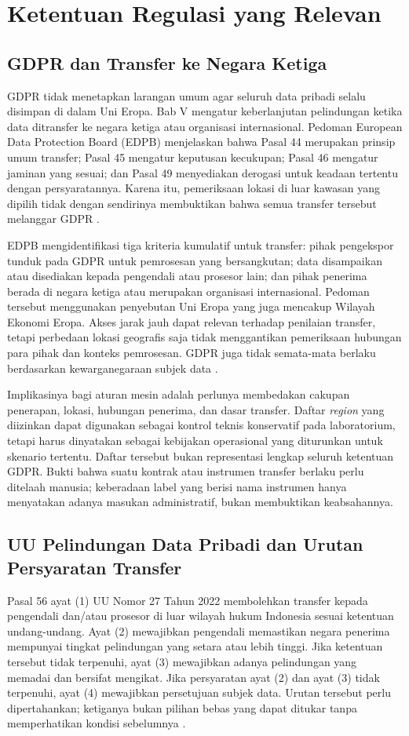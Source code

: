 \section{Ketentuan Regulasi yang Relevan}
\label{sec:regulasi-residensi}
\subsection{GDPR dan Transfer ke Negara Ketiga}
GDPR tidak menetapkan larangan umum agar seluruh data pribadi selalu disimpan di dalam Uni Eropa. Bab V mengatur keberlanjutan pelindungan ketika data ditransfer ke negara ketiga atau organisasi internasional. Pedoman European Data Protection Board (EDPB) menjelaskan bahwa Pasal 44 merupakan prinsip umum transfer; Pasal 45 mengatur keputusan kecukupan; Pasal 46 mengatur jaminan yang sesuai; dan Pasal 49 menyediakan derogasi untuk keadaan tertentu dengan persyaratannya. Karena itu, pemeriksaan lokasi di luar kawasan yang dipilih tidak dengan sendirinya membuktikan bahwa semua transfer tersebut melanggar GDPR \autocite{edpb2023}.

EDPB mengidentifikasi tiga kriteria kumulatif untuk transfer: pihak pengekspor tunduk pada GDPR untuk pemrosesan yang bersangkutan; data disampaikan atau disediakan kepada pengendali atau prosesor lain; dan pihak penerima berada di negara ketiga atau merupakan organisasi internasional. Pedoman tersebut menggunakan penyebutan Uni Eropa yang juga mencakup Wilayah Ekonomi Eropa. Akses jarak jauh dapat relevan terhadap penilaian transfer, tetapi perbedaan lokasi geografis saja tidak menggantikan pemeriksaan hubungan para pihak dan konteks pemrosesan. GDPR juga tidak semata-mata berlaku berdasarkan kewarganegaraan subjek data \autocite{edpb2023}.

Implikasinya bagi aturan mesin adalah perlunya membedakan cakupan penerapan, lokasi, hubungan penerima, dan dasar transfer. Daftar \textit{region} yang diizinkan dapat digunakan sebagai kontrol teknis konservatif pada laboratorium, tetapi harus dinyatakan sebagai kebijakan operasional yang diturunkan untuk skenario tertentu. Daftar tersebut bukan representasi lengkap seluruh ketentuan GDPR. Bukti bahwa suatu kontrak atau instrumen transfer berlaku perlu ditelaah manusia; keberadaan label yang berisi nama instrumen hanya menyatakan adanya masukan administratif, bukan membuktikan keabsahannya.

\subsection{UU Pelindungan Data Pribadi dan Urutan Persyaratan Transfer}
Pasal 56 ayat (1) UU Nomor 27 Tahun 2022 membolehkan transfer kepada pengendali dan/atau prosesor di luar wilayah hukum Indonesia sesuai ketentuan undang-undang. Ayat (2) mewajibkan pengendali memastikan negara penerima mempunyai tingkat pelindungan yang setara atau lebih tinggi. Jika ketentuan tersebut tidak terpenuhi, ayat (3) mewajibkan adanya pelindungan yang memadai dan bersifat mengikat. Jika persyaratan ayat (2) dan ayat (3) tidak terpenuhi, ayat (4) mewajibkan persetujuan subjek data. Urutan tersebut perlu dipertahankan; ketiganya bukan pilihan bebas yang dapat ditukar tanpa memperhatikan kondisi sebelumnya \autocite[Pasal 56]{uupdp2022}.

